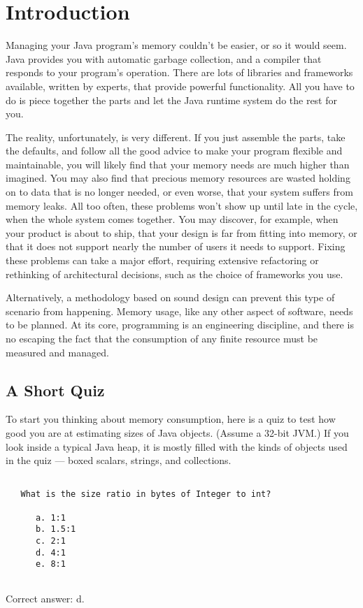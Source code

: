 
\chapter{Introduction}
\label{chapter:introduction}

Managing your Java program's memory couldn't be easier, or so it would seem.
Java provides you with automatic garbage collection, and a compiler that
responds to your program's operation. There are lots of libraries and frameworks
available, written by experts, that provide powerful functionality. All you have
to do is piece together the parts and let the Java runtime system do the rest
for you.

The reality, unfortunately, is very different.  If you just assemble the parts,
take the defaults, and follow all the good advice to make your program flexible
and maintainable, you will likely find that your memory needs are much higher
than imagined. You may also find that precious memory resources are wasted
holding on to data that is no longer needed, or even worse, that your system
suffers from memory leaks. All too often, these problems won't show up until
late in the cycle, when the whole system comes together. You may discover, 
for example, when your product is about to ship, that your design is far from fitting into memory, 
or that it does not support nearly the number of users it
needs to support.  Fixing these problems can take a major effort, requiring
extensive refactoring or rethinking of architectural decisions, such as the
choice of frameworks you use.  

Alternatively, a methodology based on sound design can
prevent this type of scenario from happening. Memory usage, like any other
aspect of software, needs to be planned. At its core, programming is an engineering
discipline, and there is no escaping the fact that the consumption of any finite
resource must be measured and managed.


\section{A Short Quiz}

 To start you thinking about memory
consumption, here is a quiz to test how good you are at estimating sizes of Java objects. 
(Assume a 32-bit JVM.) If you look inside a typical Java heap, it is mostly filled with the kinds of
objects used in the quiz --- boxed scalars, strings, and collections.
\begin{verbatim}

   What is the size ratio in bytes of Integer to int?
   
      a. 1:1
      b. 1.5:1
      c. 2:1
      d. 4:1
      e. 8:1
      
\end{verbatim}
Correct answer: d. 

